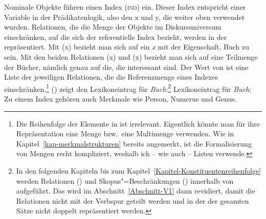 Nominale Objekte führen einen Index (\textsc{ind}) ein. Dieser Index entspricht einer Variable in
der Prädikatenlogik, also den x und y, die weiter oben verwendet wurden. Relationen, die die Menge
der Objekte im Diskursuniversum einschränken, auf die sich der referentielle Index bezieht, werden
in der \relsl{} repräsentiert. Mit (x) bezieht man sich auf ein \emph{x} mit der
Eigenschaft, Buch zu sein. Mit den beiden Relationen (x) und (x)
bezieht man sich auf eine Teilmenge der Bücher, nämlich genau auf die, die interessant sind.
Der Wert von \rels ist eine Liste der jeweiligen Relationen, die die Referenzmenge eines Indexes einschränken.\footnote{
  Die Reihenfolge der Elemente in \rels ist irrelevant. Eigentlich könnte man für ihre
  Repräsentation eine Menge bzw.\ eine Multimenge verwenden. Wie in Kapitel~\ref{kap-merkmalstrukturen} bereits angemerkt, ist die
  Formalisierung von Mengen recht kompliziert, weshalb ich -- wie \citeauthor*{CFPS2005a} auch – Listen verwende.%
}
() zeigt den Lexikoneintrag für \emph{Buch}:\footnote{
  In den folgenden Kapiteln bis zum Kapitel~\ref{Kapitel-Konstituentenreihenfolge} werden Relationen (\rels)
  und Skopus"=Beschränkungen (\hcons) innerhalb von \cont{} aufgeführt. Das wird im Abschnitt~\ref{Abschnitt-V1} dann
  revidiert, damit die Relationen nicht mit der Verbspur geteilt werden und in der \relsl der
  gesamten Sätze nicht doppelt repräsentiert werden.
}
\eas
\label{le-buch}%
Lexikoneintrag für \emph{Buch}:\\
\zs
Zu einem Index gehören auch Merkmale wie Person, Numerus und Genus.
